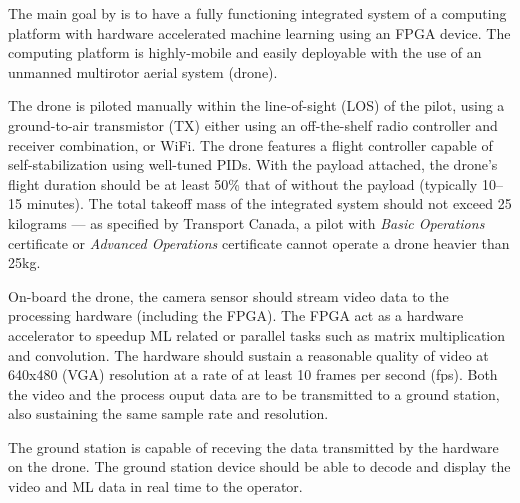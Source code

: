 The main goal by is to have a fully functioning integrated system of a computing platform with hardware accelerated machine learning using an FPGA device. 
The computing platform is highly-mobile and easily deployable with the use of an unmanned multirotor aerial system (drone). 

The drone is piloted manually within the line-of-sight (LOS) of the pilot, using a ground-to-air transmistor (TX) either using an off-the-shelf radio controller and receiver combination, or WiFi. 
The drone features a flight controller capable of self-stabilization using well-tuned PIDs.
With the payload attached, the drone's flight duration should be at least 50\% that of without the payload (typically 10--15 minutes).
The total takeoff mass of the integrated system should not exceed 25 kilograms --- as specified by Transport Canada, a pilot with \textit{Basic Operations}
certificate or \textit{Advanced Operations} certificate cannot operate a drone heavier than 25kg.

On-board the drone, the camera sensor should stream video data to the processing hardware (including the FPGA). 
The FPGA act as a hardware accelerator to speedup ML related or parallel tasks such as matrix multiplication and convolution.
The hardware should sustain a reasonable quality of video at 640x480 (VGA) resolution at a rate of at least 10 frames per second (fps).
Both the video and the process ouput data are to be transmitted to a ground station, also sustaining the same sample rate and resolution.

The ground station is capable of receving the data transmitted by the hardware on the drone. The ground station device should be able
to decode and display the video and ML data in real time to the operator.